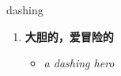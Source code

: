 
\begin{frame}
{\huge dashing}
\begin{center}
\begin{enumerate}\Large
  \item \textbf{大胆的，爱冒险的}
  \begin{itemize}
    \item \em{\Large{a dashing hero}}
  \end{itemize}
\end{enumerate}
\end{center}
\end{frame}

